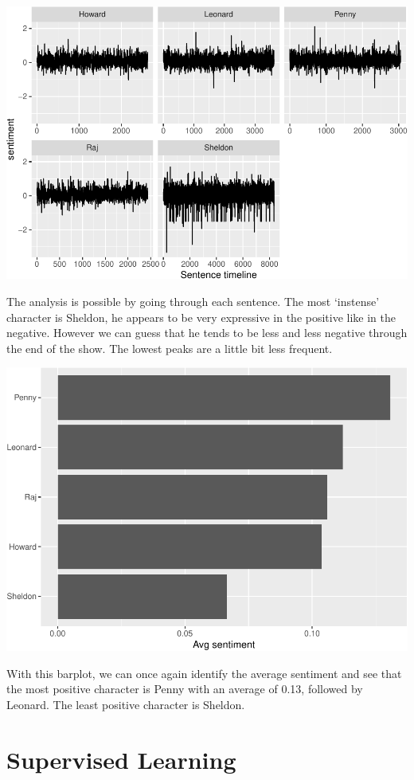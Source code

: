 \documentclass[
]{article}
\begin{document}
\includegraphics{report_files/figure-latex/unnamed-chunk-70-1.pdf}

The analysis is possible by going through each sentence. The most
`instense' character is Sheldon, he appears to be very expressive in the
positive like in the negative. However we can guess that he tends to be
less and less negative through the end of the show. The lowest peaks are
a little bit less frequent.

\includegraphics{report_files/figure-latex/unnamed-chunk-72-1.pdf}

With this barplot, we can once again identify the average sentiment and
see that the most positive character is Penny with an average of 0.13,
followed by Leonard. The least positive character is Sheldon.

\hypertarget{supervised-learning}{%
\section{Supervised Learning}\label{supervised-learning}}
\end{document}
